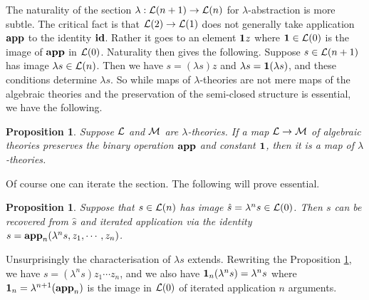 \documentclass[12pt, amstex, amssymb]{article}
\newtheorem{proposition}[theorem]{Proposition}
\newcommand{\mcat}{\cal}
\newcommand{\app}{{\bf 1}}
\begin{document}
The naturality of the section $\lambda: {\mcat L}(n + 1) \to {\mcat L}(n)$ 
for $\lambda$-abstraction is
more subtle. The critical fact is that 
${\mcat L}(2) \to {\mcat L}(1)$ does not generally take
application ${\bf app}$ to the identity ${\bf id}$. Rather 
it goes to an element $\app z$ where $\app \in {\mcat L}(0)$ 
is the image of ${\bf app}$ in ${\mcat L}(0)$. Naturality
then gives the following. Suppose $s \in {\mcat L}(n+1)$
has image $\lambda s \in {\mcat L}(n)$. Then we have $s = (\lambda s)z$
and $\lambda s = \app (\lambda s)$, and these conditions determine
$\lambda s$. So while maps of $\lambda$-theories
are not mere 
maps of the algebraic theories and the preservation
of the semi-closed structure is essential, 
we have the following.
\begin{proposition}\label{theorymap}
Suppose $\mcat L$ and $\mcat M$ are $\lambda$-theories.
If a map ${\mcat L} \to {\mcat M}$ of algebraic theories
preserves the binary operation ${\bf app}$ and constant $\app$,
then it is a map of $\lambda$-theories.
\end{proposition}
Of course one can iterate the section. The following will prove
essential. 
\begin{proposition}\label{abstraction}
Suppose that $s \in {\mcat L}(n)$ has image 
$\hat{s} = \lambda^n{s} \in {\mcat L}(0)$.
Then $s$ can be recovered from $\hat{s}$ and iterated
application via the identity
$s = {\bf app}_n (\lambda^n{s}, z_1, \cdots ,z_n)$.
\end{proposition}
Unsurprisingly the characterisation of $\lambda s$ extends. 
Rewriting the Proposition \ref{abstraction}, 
we have $s = (\lambda^n{s})z_1 \cdots z_n$,
and we also have $\app_n (\lambda^n{s}) = \lambda^n{s}$ where 
$\app_n = \lambda^{n+1}({\bf app}_n)$ is
the image in ${\mcat L}(0)$ of iterated application
$n$ arguments.
 
\end{document}
